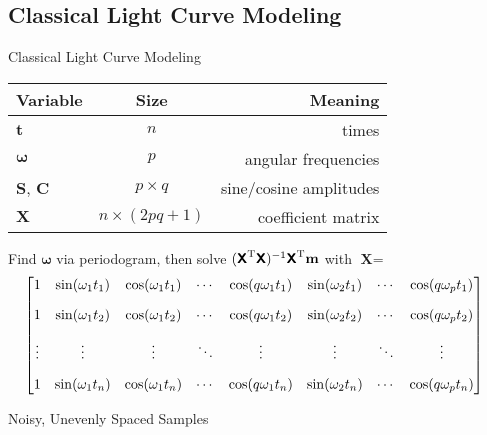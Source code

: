 \documentclass{beamer}
\begin{document}
\subsection{Classical Light Curve Modeling}
\begin{frame}{Classical Light Curve Modeling}%
\begin{center}
\begin{tabular}{lcr}
\textbf{Variable} & \textbf{Size} & \textbf{Meaning} \\ \hline\hline
$\mathbf t$ & $n$ & times \\
$\boldsymbol \omega$ & $p$ & angular frequencies \\
$\mathbf S$, $\mathbf C$ & ${p\times q}$ & sine/cosine amplitudes \\ 
$\mathbf X$ & ${n \times (2pq+1)}$ & coefficient matrix \\ \hline
\end{tabular}
\end{center}
Find $\boldsymbol \omega$ via periodogram, then solve $(\textsf{\textbf{X}}^\text{T} \textsf{\textbf{X}})^{-1} \textsf{\textbf{X}}^\text{T} \mathbf{m}$ with $\textbf{X} = $ \setlength{\arraycolsep}{4pt} $$ 
\hspace*{-3mm} \begin{bmatrix}
1 & \sin(\omega_1 t_1)
  & \cos(\omega_1 t_1) & \cdots
  & \cos(q \omega_1 t_1)
  & \sin(\omega_2 t_1) & \cdots
  & \cos(q \omega_p t_1) \\[2.2ex]

1 & \sin(\omega_1 t_2)
  & \cos(\omega_1 t_2) & \cdots
  & \cos(q \omega_1 t_2)
  & \sin(\omega_2 t_2) & \cdots
  & \cos(q \omega_p t_2) \\[2.2ex]

\vdots & \vdots & \vdots & \ddots & \vdots & \vdots & \ddots & \vdots \\[2.2ex]

1 & \sin(\omega_1 t_n)
  & \cos(\omega_1 t_n) & \cdots
  & \cos(q \omega_1 t_n)
  & \sin(\omega_2 t_n) & \cdots
  & \cos(q \omega_p t_n) %
\end{bmatrix} $$
\end{frame}

\begin{frame}{Noisy, Unevenly Spaced Samples}
\begin{figure}
\centering

\end{figure} 
\end{frame}
\end{document}
